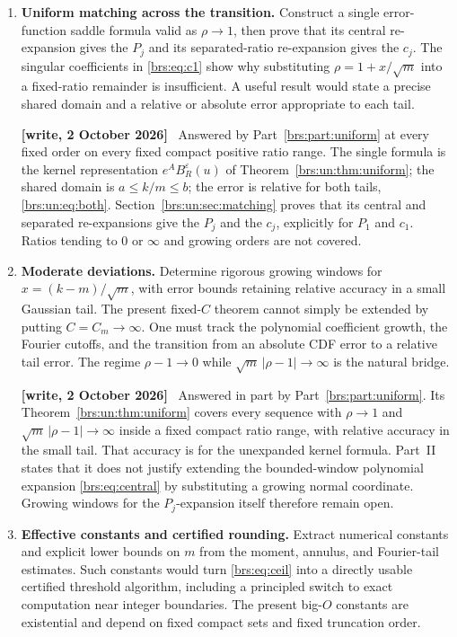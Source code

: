\documentclass[11pt]{article}
\numberwithin{equation}{section}
\theoremstyle{remark}\newtheorem{remark}[theorem]{Remark}
\newenvironment{writenote}{\par\smallskip\begingroup\small\noindent\textbf{[write, 2 October 2026]}\ }{\par\endgroup\smallskip}
\begin{document}
\begin{enumerate}[leftmargin=*,itemsep=0.7em]
\item \textbf{Uniform matching across the transition.}
Construct a single error-function saddle formula valid as
$\rho\to1$, then prove that its central re-expansion gives the $P_j$
and its separated-ratio re-expansion gives the $c_j$.  The singular
coefficients in \eqref{brs:eq:c1} show why substituting
$\rho=1+x/\sqrt m$ into a fixed-ratio remainder is insufficient.
A useful result would state a precise shared domain and a relative or
absolute error appropriate to each tail.

\begin{writenote}
Answered by Part~\ref{brs:part:uniform} at every fixed order on every fixed compact positive ratio range. The single formula is the kernel representation $e^AB_R^\varepsilon(u)$ of Theorem~\ref{brs:un:thm:uniform}; the shared domain is $a\le k/m\le b$; the error is relative for both tails, \eqref{brs:un:eq:both}. Section~\ref{brs:un:sec:matching} proves that its central and separated re-expansions give the $P_j$ and the $c_j$, explicitly for $P_1$ and $c_1$. Ratios tending to $0$ or $\infty$ and growing orders are not covered.
\end{writenote}

\item \textbf{Moderate deviations.}
Determine rigorous growing windows for $x=(k-m)/\sqrt m$, with error
bounds retaining relative accuracy in a small Gaussian tail.  The
present fixed-$C$ theorem cannot simply be extended by putting
$C=C_m\to\infty$.  One must track the polynomial coefficient growth,
the Fourier cutoffs, and the transition from an absolute CDF error to
a relative tail error.  The regime $\rho-1\to0$ while
$\sqrt m\,|\rho-1|\to\infty$ is the natural bridge.

\begin{writenote}
Answered in part by Part~\ref{brs:part:uniform}. Its Theorem~\ref{brs:un:thm:uniform} covers every sequence with $\rho\to1$ and $\sqrt m\,|\rho-1|\to\infty$ inside a fixed compact ratio range, with relative accuracy in the small tail. That accuracy is for the unexpanded kernel formula. Part~II states that it does not justify extending the bounded-window polynomial expansion \eqref{brs:eq:central} by substituting a growing normal coordinate. Growing windows for the $P_j$-expansion itself therefore remain open.
\end{writenote}

\item \textbf{Effective constants and certified rounding.}
Extract numerical constants and explicit lower bounds on $m$ from the
moment, annulus, and Fourier-tail estimates.  Such constants would turn
\eqref{brs:eq:ceil} into a directly usable certified threshold algorithm,
including a principled switch to exact computation near integer
boundaries.  The present big-$O$ constants are existential and depend on
fixed compact sets and fixed truncation order.


\end{enumerate}
\end{document}

